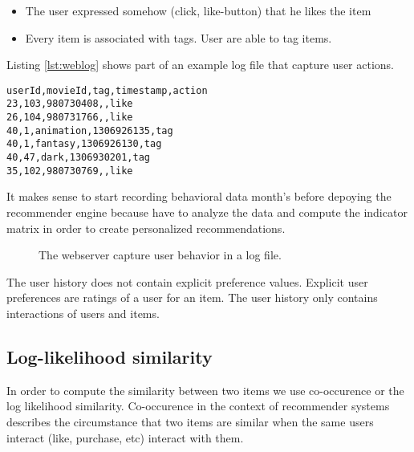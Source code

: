 \begin{itemize}
\item The user expressed somehow (click, like-button) that he likes the item
\item Every item is associated with tags. User are able to tag items.
\end{itemize}

Listing \ref{lst:weblog} shows part of an example log file that capture user actions.

\lstset{
basicstyle=\ttfamily,
columns=fullflexible,
keepspaces=true,
captionpos=b
}
\begin{lstlisting}[caption={User actions are stored in a web log.},label={lst:weblog}]
userId,movieId,tag,timestamp,action
23,103,980730408,,like
26,104,980731766,,like
40,1,animation,1306926135,tag
40,1,fantasy,1306926130,tag
40,47,dark,1306930201,tag
35,102,980730769,,like
\end{lstlisting}

It makes sense to start recording behavioral data month's before depoying the recommender engine because have to analyze the data and compute the indicator matrix in order to create personalized recommendations.

\begin{figure}
\centering
{}
\caption{The webserver capture user behavior in a log file.}
\end{figure}

The user history does not contain explicit preference values. Explicit user preferences are ratings of a user for an item. The user history only contains interactions of users and items. 

\subsection{Log-likelihood similarity}
\label{sec:llr}

In order to compute the similarity between two items we use co-occurence or the log likelihood similarity.
Co-occurence in the context of recommender systems describes the circumstance that two items are similar when the same users interact (like, purchase, etc) interact with them.

